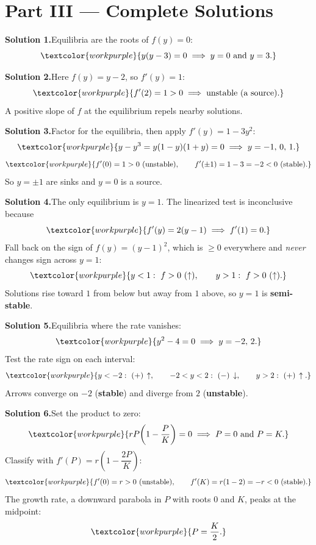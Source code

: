 \section*{Part III --- Complete Solutions}

\noindent\textbf{Solution 1.}\quad Equilibria are the roots of $f(y)=0$:
\[ \textcolor{workpurple}{y(y-3) = 0 \;\Longrightarrow\; y = 0 \text{ and } y = 3.} \]

\medskip
\noindent\textbf{Solution 2.}\quad Here $f(y) = y - 2$, so $f'(y) = 1$:
\[ \textcolor{workpurple}{f'(2) = 1 > 0 \;\Longrightarrow\; \text{unstable (a source).}} \]
A positive slope of $f$ at the equilibrium repels nearby solutions.

\medskip
\noindent\textbf{Solution 3.}\quad Factor for the equilibria, then apply
$f'(y) = 1 - 3y^{2}$:
\[ \textcolor{workpurple}{y - y^{3} = y(1-y)(1+y) = 0 \;\Longrightarrow\; y = -1,\,0,\,1.} \]
\[ \textcolor{workpurple}{f'(0) = 1 > 0\ (\text{unstable}), \qquad f'(\pm 1) = 1 - 3 = -2 < 0\ (\text{stable}).} \]
So $y = \pm 1$ are sinks and $y = 0$ is a source.

\medskip
\noindent\textbf{Solution 4.}\quad The only equilibrium is $y = 1$. The
linearized test is inconclusive because
\[ \textcolor{workpurple}{f'(y) = 2(y-1) \;\Longrightarrow\; f'(1) = 0.} \]
Fall back on the sign of $f(y) = (y-1)^{2}$, which is $\ge 0$ everywhere and
\emph{never} changes sign across $y = 1$:
\[ \textcolor{workpurple}{y<1:\ f>0\ (\uparrow), \qquad y>1:\ f>0\ (\uparrow).} \]
Solutions rise toward $1$ from below but away from $1$ above, so $y = 1$ is
\textbf{semi-stable}.

\medskip
\noindent\textbf{Solution 5.}\quad Equilibria where the rate vanishes:
\[ \textcolor{workpurple}{y^{2} - 4 = 0 \;\Longrightarrow\; y = -2,\,2.} \]
Test the rate sign on each interval:
\[ \textcolor{workpurple}{y<-2:\ (+)\,\uparrow, \qquad -2<y<2:\ (-)\,\downarrow, \qquad y>2:\ (+)\,\uparrow.} \]
Arrows converge on $-2$ (\textbf{stable}) and diverge from $2$
(\textbf{unstable}).

\medskip
\noindent\textbf{Solution 6.}\quad Set the product to zero:
\[ \textcolor{workpurple}{rP\!\left(1-\frac{P}{K}\right) = 0 \;\Longrightarrow\; P = 0 \text{ and } P = K.} \]
Classify with $f'(P) = r\!\left(1 - \dfrac{2P}{K}\right)$:
\[ \textcolor{workpurple}{f'(0) = r > 0\ (\text{unstable}), \qquad f'(K) = r(1-2) = -r < 0\ (\text{stable}).} \]
The growth rate, a downward parabola in $P$ with roots $0$ and $K$, peaks at the
midpoint:
\[ \textcolor{workpurple}{P = \frac{K}{2}.} \]

